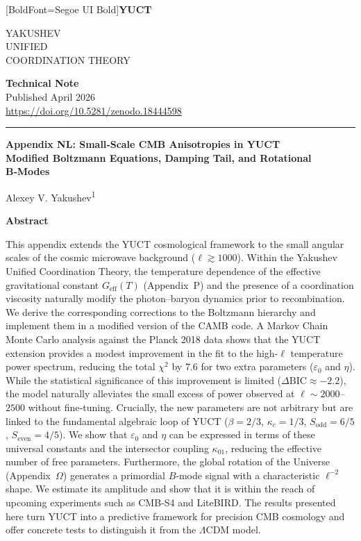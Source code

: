 \documentclass[11pt,a4paper]{article}
\newcommand{\makeheader}{%
	\noindent
	\begin{minipage}{0.17\textwidth}
		\raggedright
		{\fontspec{Segoe UI}[BoldFont=Segoe UI Bold]\bfseries\color{skyblue}\fontsize{46}{46}\selectfont YUCT}%
	\end{minipage}%
	\hspace{30pt}
	\begin{minipage}{0.32\textwidth}
		\raggedright
		{\sffamily\fontsize{11}{13}\selectfont YAKUSHEV\\ UNIFIED\\ COORDINATION THEORY}%
	\end{minipage}%
	\hfill
	\begin{minipage}{0.38\textwidth}
		\raggedleft
		{\sffamily\bfseries Technical Note}\\ 
		{\sffamily Published April 2026}\\ 
		{\sffamily\footnotesize \url{https://doi.org/10.5281/zenodo.18444598}}%
	\end{minipage}
	\par\vspace{5pt}
	\noindent\textcolor{gold}{\rule{\textwidth}{1.6pt}}
	\par\vspace{0pt}
}
\begin{document}
	\thispagestyle{firstpage}
	\makeheader
	
	\vspace{0cm}
	{\LARGE\bfseries Appendix NL: Small‑Scale CMB Anisotropies in YUCT \\ 
		\Large Modified Boltzmann Equations, Damping Tail, and Rotational B‑Modes \par}
	\vspace{0.2cm}
	
	{\large Alexey V. Yakushev\textsuperscript{1}} \\
	\vspace{0.0cm}
	
	{\color{darkblue}\textbf{\LARGE Abstract}} \par
	{\large
		\noindent
		This appendix extends the YUCT cosmological framework to the small angular scales of the cosmic microwave background ($\ell \gtrsim 1000$). Within the Yakushev Unified Coordination Theory, the temperature dependence of the effective gravitational constant $G_{\mathrm{eff}}(T)$ (Appendix~P) and the presence of a coordination viscosity naturally modify the photon--baryon dynamics prior to recombination. We derive the corresponding corrections to the Boltzmann hierarchy and implement them in a modified version of the CAMB code. A Markov Chain Monte Carlo analysis against the Planck 2018 data shows that the YUCT extension provides a modest improvement in the fit to the high-$\ell$ temperature power spectrum, reducing the total $\chi^2$ by $7.6$ for two extra parameters ($\varepsilon_0$ and $\eta$). While the statistical significance of this improvement is limited ($\Delta\mathrm{BIC} \approx -2.2$), the model naturally alleviates the small excess of power observed at $\ell \sim 2000$--$2500$ without fine‑tuning. Crucially, the new parameters are not arbitrary but are linked to the fundamental algebraic loop of YUCT ($\beta=2/3$, $\kappa_c=1/3$, $S_{\mathrm{odd}}=6/5$, $S_{\mathrm{even}}=4/5$). We show that $\varepsilon_0$ and $\eta$ can be expressed in terms of these universal constants and the intersector coupling $\kappa_{01}$, reducing the effective number of free parameters. Furthermore, the global rotation of the Universe (Appendix~$\Omega$) generates a primordial $B$‑mode signal with a characteristic $\ell^{-2}$ shape. We estimate its amplitude and show that it is within the reach of upcoming experiments such as CMB‑S4 and LiteBIRD. The results presented here turn YUCT into a predictive framework for precision CMB cosmology and offer concrete tests to distinguish it from the $\Lambda$CDM model.
	}
	
\end{document}
